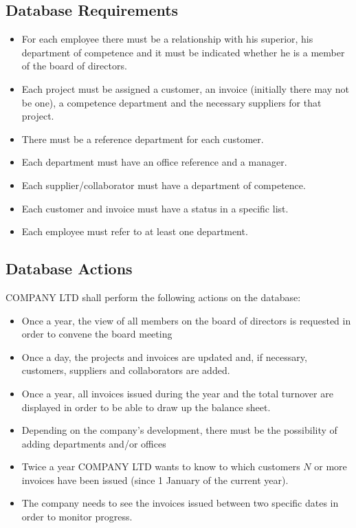 \documentclass[12pt,a4paper]{article}
\begin{document}
\subsection{Database Requirements}\label{subsec:database-requirements}
\begin{itemize}
  \item For each employee there must be a relationship with his superior, his department of competence and it must be indicated whether he is a member of the board of directors.
  \item Each project must be assigned a customer, an invoice (initially there may not be one), a competence department and the necessary suppliers for that project.
  \item There must be a reference department for each customer.
  \item Each department must have an office reference and a manager.
  \item Each supplier/collaborator must have a department of competence.
  \item Each customer and invoice must have a status in a specific list.
  \item Each employee must refer to at least one department.
\end{itemize}

\subsection{Database Actions}\label{subsec:database-actions}
COMPANY LTD shall perform the following actions on the database:
\begin{itemize}
  \item Once a year, the view of all members on the board of directors is requested in order to convene the board meeting
  \item Once a day, the projects and invoices are updated and, if necessary, customers, suppliers and collaborators are added.
  \item Once a year, all invoices issued during the year and the total turnover are displayed in order to be able to draw up the balance sheet.
  \item Depending on the company's development, there must be the possibility of adding departments and/or offices
  \item Twice a year COMPANY LTD wants to know to which customers $N$ or more invoices have been issued (since 1 January of the current year).
  \item The company needs to see the invoices issued between two specific dates in order to monitor progress.
\end{itemize}
\end{document}
